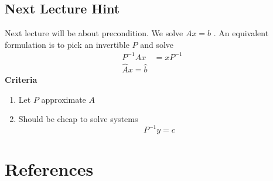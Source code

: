 \documentclass{article}
\theoremstyle{remark}
\begin{document}
 
\subsection{Next Lecture Hint}%
\label{sub:next_lecture_hint}

Next lecture will be about precondition. We solve $Ax =b$ . An equivalent formulation is to pick an invertible $P$ and solve \[
  \begin{split}
P^{-1} Ax &=   x P^{-1} \\
\hat{A} x = \hat{b}
  \end{split} 
\]  
\textbf{Criteria } 
\begin{enumerate}
  \item Let $P$ approximate $A$ 
  \item Should be cheap to solve systems \[
  P^{-1} y = c
  \] 
\end{enumerate}



\newpage
\section{References}%
\label{sec:references}



  



\end{document}
